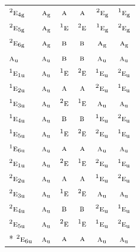 \documentclass[10pt,a4paper]{article}
\numberwithin{equation}{section}
\newcommand{\irr}[1]{\text{\normalfont\scshape #1}}
\newcommand{\conjpair}[1]{{}^{#1}}
\newcommand{\ptag}[1]{\mathrm{#1}}
\begin{document}
{\begin{longtable}{@{}lccccc@{}}
$\conjpair{2}\irr{e}_{4\ptag{g}}$ & $\irr{a}_{\ptag{g}}$ & $\irr{a}$ & $\irr{a}$ & $\conjpair{2}\irr{e}_{\ptag{g}}$ & $\conjpair{1}\irr{e}_{\ptag{g}}$\\
$\conjpair{2}\irr{e}_{5\ptag{g}}$ & $\irr{a}_{\ptag{g}}$ & $\conjpair{1}\irr{e}$ & $\conjpair{2}\irr{e}$ & $\conjpair{1}\irr{e}_{\ptag{g}}$ & $\conjpair{2}\irr{e}_{\ptag{g}}$\\
$\conjpair{2}\irr{e}_{6\ptag{g}}$ & $\irr{a}_{\ptag{g}}$ & $\irr{b}$ & $\irr{b}$ & $\irr{a}_{\ptag{g}}$ & $\irr{a}_{\ptag{g}}$\\
$\irr{a}_{\ptag{u}}$ & $\irr{a}_{\ptag{u}}$ & $\irr{b}$ & $\irr{b}$ & $\irr{a}_{\ptag{u}}$ & $\irr{a}_{\ptag{u}}$\\
$\conjpair{1}\irr{e}_{1\ptag{u}}$ & $\irr{a}_{\ptag{u}}$ & $\conjpair{1}\irr{e}$ & $\conjpair{2}\irr{e}$ & $\conjpair{1}\irr{e}_{\ptag{u}}$ & $\conjpair{2}\irr{e}_{\ptag{u}}$\\
$\conjpair{1}\irr{e}_{2\ptag{u}}$ & $\irr{a}_{\ptag{u}}$ & $\irr{a}$ & $\irr{a}$ & $\conjpair{2}\irr{e}_{\ptag{u}}$ & $\conjpair{1}\irr{e}_{\ptag{u}}$\\
$\conjpair{1}\irr{e}_{3\ptag{u}}$ & $\irr{a}_{\ptag{u}}$ & $\conjpair{2}\irr{e}$ & $\conjpair{1}\irr{e}$ & $\irr{a}_{\ptag{u}}$ & $\irr{a}_{\ptag{u}}$\\
$\conjpair{1}\irr{e}_{4\ptag{u}}$ & $\irr{a}_{\ptag{u}}$ & $\irr{b}$ & $\irr{b}$ & $\conjpair{1}\irr{e}_{\ptag{u}}$ & $\conjpair{2}\irr{e}_{\ptag{u}}$\\
$\conjpair{1}\irr{e}_{5\ptag{u}}$ & $\irr{a}_{\ptag{u}}$ & $\conjpair{1}\irr{e}$ & $\conjpair{2}\irr{e}$ & $\conjpair{2}\irr{e}_{\ptag{u}}$ & $\conjpair{1}\irr{e}_{\ptag{u}}$\\
$\conjpair{1}\irr{e}_{6\ptag{u}}$ & $\irr{a}_{\ptag{u}}$ & $\irr{a}$ & $\irr{a}$ & $\irr{a}_{\ptag{u}}$ & $\irr{a}_{\ptag{u}}$\\
$\conjpair{2}\irr{e}_{1\ptag{u}}$ & $\irr{a}_{\ptag{u}}$ & $\conjpair{2}\irr{e}$ & $\conjpair{1}\irr{e}$ & $\conjpair{2}\irr{e}_{\ptag{u}}$ & $\conjpair{1}\irr{e}_{\ptag{u}}$\\
$\conjpair{2}\irr{e}_{2\ptag{u}}$ & $\irr{a}_{\ptag{u}}$ & $\irr{a}$ & $\irr{a}$ & $\conjpair{1}\irr{e}_{\ptag{u}}$ & $\conjpair{2}\irr{e}_{\ptag{u}}$\\
$\conjpair{2}\irr{e}_{3\ptag{u}}$ & $\irr{a}_{\ptag{u}}$ & $\conjpair{1}\irr{e}$ & $\conjpair{2}\irr{e}$ & $\irr{a}_{\ptag{u}}$ & $\irr{a}_{\ptag{u}}$\\
$\conjpair{2}\irr{e}_{4\ptag{u}}$ & $\irr{a}_{\ptag{u}}$ & $\irr{b}$ & $\irr{b}$ & $\conjpair{2}\irr{e}_{\ptag{u}}$ & $\conjpair{1}\irr{e}_{\ptag{u}}$\\
$\conjpair{2}\irr{e}_{5\ptag{u}}$ & $\irr{a}_{\ptag{u}}$ & $\conjpair{2}\irr{e}$ & $\conjpair{1}\irr{e}$ & $\conjpair{1}\irr{e}_{\ptag{u}}$ & $\conjpair{2}\irr{e}_{\ptag{u}}$\\*
$\conjpair{2}\irr{e}_{6\ptag{u}}$ & $\irr{a}_{\ptag{u}}$ & $\irr{a}$ & $\irr{a}$ & $\irr{a}_{\ptag{u}}$ & $\irr{a}_{\ptag{u}}$\\
\bottomrule\end{longtable}}
\end{document}
